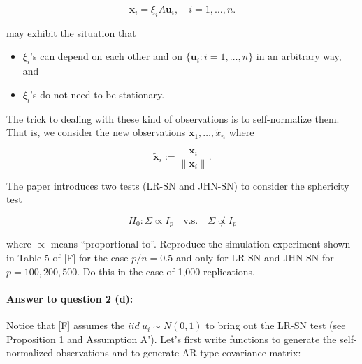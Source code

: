 \documentclass[
]{article}
\providecommand{\tightlist}{%
  \setlength{\itemsep}{0pt}\setlength{\parskip}{0pt}}
\begin{document}
\[
\mathbf{x}_i = \xi_iA\mathbf{u}_i, \quad i = 1, \ldots, n.
\]

may exhibit the situation that

\begin{itemize}
\tightlist
\item
  \(\xi_i\)'s can depend on each other and on
  \(\{ \mathbf{u}_i : i = 1, \ldots, n \}\) in an arbitrary way, and
\item
  \(\xi_i\)'s do not need to be stationary.
\end{itemize}

The trick to dealing with these kind of observations is to
self-normalize them. That is, we consider the new observations
\(\tilde{\mathbf{x}}_1, \ldots, \tilde{x}_n\) where

\[
\tilde{\mathbf{x}}_i := \frac{\mathbf{x}_i}{\| \mathbf{x}_i \|}.
\]

The paper introduces two tests (LR-SN and JHN-SN) to consider the
sphericity test

\[
H_0 : \Sigma \propto I_p \quad \text{v.s.} \quad \Sigma \not\propto I_p
\]

where \(\propto\) means ``proportional to''. Reproduce the simulation
experiment shown in Table 5 of {[}F{]} for the case \(p/n = 0.5\) and
only for LR-SN and JHN-SN for \(p = 100, 200, 500\). Do this in the case
of 1,000 replications.

\paragraph{\texorpdfstring{\textbf{Answer to question 2
(d)}:}{Answer to question 2 (d):}}\label{answer-to-question-2-d}

Notice that {[}F{]} assumes the \(iid \ u_i \sim N(0,1)\) to bring out
the LR-SN test (see Proposition 1 and Assumption A'). Let's first write
functions to generate the self-normalized observations and to generate
AR-type covariance matrix:
\end{document}
